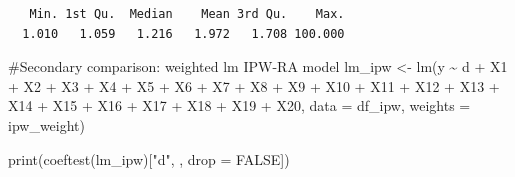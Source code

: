 \documentclass[
  letterpaper,
  DIV=11,
  numbers=noendperiod]{scrartcl}
\newenvironment{Shaded}{\begin{snugshade}}{\end{snugshade}}
\newcommand{\AttributeTok}[1]{\textcolor[rgb]{0.40,0.45,0.13}{#1}}
\newcommand{\CommentTok}[1]{\textcolor[rgb]{0.37,0.37,0.37}{#1}}
\newcommand{\ConstantTok}[1]{\textcolor[rgb]{0.56,0.35,0.01}{#1}}
\newcommand{\DecValTok}[1]{\textcolor[rgb]{0.68,0.00,0.00}{#1}}
\newcommand{\FunctionTok}[1]{\textcolor[rgb]{0.28,0.35,0.67}{#1}}
\newcommand{\NormalTok}[1]{\textcolor[rgb]{0.00,0.23,0.31}{#1}}
\newcommand{\OtherTok}[1]{\textcolor[rgb]{0.00,0.23,0.31}{#1}}
\newcommand{\SpecialCharTok}[1]{\textcolor[rgb]{0.37,0.37,0.37}{#1}}
\newcommand{\StringTok}[1]{\textcolor[rgb]{0.13,0.47,0.30}{#1}}
\begin{document}
\begin{Shaded}
\end{Shaded}

\begin{verbatim}
   Min. 1st Qu.  Median    Mean 3rd Qu.    Max. 
  1.010   1.059   1.216   1.972   1.708 100.000 
\end{verbatim}

\begin{Shaded}
\begin{Highlighting}[]
\CommentTok{\#Secondary comparison: weighted lm IPW{-}RA model}
\NormalTok{lm\_ipw }\OtherTok{\textless{}{-}} \FunctionTok{lm}\NormalTok{(y }\SpecialCharTok{\textasciitilde{}}\NormalTok{ d }\SpecialCharTok{+}\NormalTok{ X1 }\SpecialCharTok{+}\NormalTok{ X2 }\SpecialCharTok{+}\NormalTok{ X3 }\SpecialCharTok{+}\NormalTok{ X4 }\SpecialCharTok{+}\NormalTok{ X5 }\SpecialCharTok{+}\NormalTok{ X6 }\SpecialCharTok{+}\NormalTok{ X7 }\SpecialCharTok{+}\NormalTok{ X8 }\SpecialCharTok{+}\NormalTok{ X9 }\SpecialCharTok{+}\NormalTok{ X10 }\SpecialCharTok{+}\NormalTok{ X11 }\SpecialCharTok{+}
\NormalTok{             X12 }\SpecialCharTok{+}\NormalTok{ X13 }\SpecialCharTok{+}\NormalTok{ X14 }\SpecialCharTok{+}\NormalTok{ X15 }\SpecialCharTok{+}\NormalTok{ X16 }\SpecialCharTok{+}\NormalTok{ X17 }\SpecialCharTok{+}\NormalTok{ X18 }\SpecialCharTok{+}\NormalTok{ X19 }\SpecialCharTok{+}\NormalTok{ X20,}
             \AttributeTok{data =}\NormalTok{ df\_ipw, }\AttributeTok{weights =}\NormalTok{ ipw\_weight)}

\FunctionTok{print}\NormalTok{(}\FunctionTok{coeftest}\NormalTok{(lm\_ipw)[}\StringTok{"d"}\NormalTok{, , }\AttributeTok{drop =} \ConstantTok{FALSE}\NormalTok{])}
\end{Highlighting}
\end{Shaded}
\end{document}
